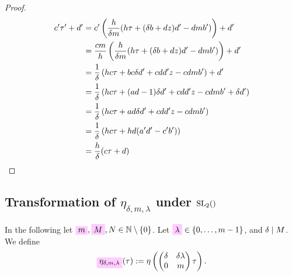 \documentclass{article}
\begin{document}
\begin{proof}
\begin{align*}
  c'\tau'+d'
  &=
  c'
    \left(
    \frac{h}{\delta m}(h\tau + (\delta b + d z) d' - d m b')
    \right) + d'\\
  &=
    \frac{c m}{h}
    \left(
    \frac{h}{\delta m}(h \tau + (\delta b + d z) d' - d m b')
    \right) + d'\\
  &=
    \frac{1}{\delta}
    \left(
    h c \tau + b c \delta d' + c d d' z - c d m b'
    \right) + d'\\
  &=
    \frac{1}{\delta}
    \left(
    h c \tau + (a d - 1) \delta d' + c d d' z - c d m b'
    + \delta d'
    \right)\\
  &=
    \frac{1}{\delta}
    \left(
    h c \tau + a d \delta d' + c d d' z - c d m b'
    \right)\\
  &=
    \frac{1}{\delta}
    \left(
    h c \tau + h d (a' d' - c' b')
    \right)\\
  &=
    \frac{h}{\delta} (c\tau + d)
\end{align*}
\end{proof}
\endgroup












\subsection{Transformation of $\eta_{\delta,m,\lambda}$ under $\SL2Z$}
\label{sec:eta_delta-m-lambda}

In the following let
$\defineNotation[m]{m},
\defineNotation[M]{M},
N \in \setN \setminus \Set{0}$.
%
Let $\defineNotation[lambda]{\lambda} \in \Set{0,\ldots,m-1}$, and
$\delta \mid M$.
%
We define
\begin{gather}
  \defineNotation[eta-delta-m-lambda-tau]{\eta_{\delta,m,\lambda}}(\tau)
  := \eta \left(
    \begin{pmatrix}\delta& \delta \lambda\\0&m\end{pmatrix} \tau
  \right).
\label{eq:eta_delta-m-lambda(tau)}
\end{gather}
\end{document}
